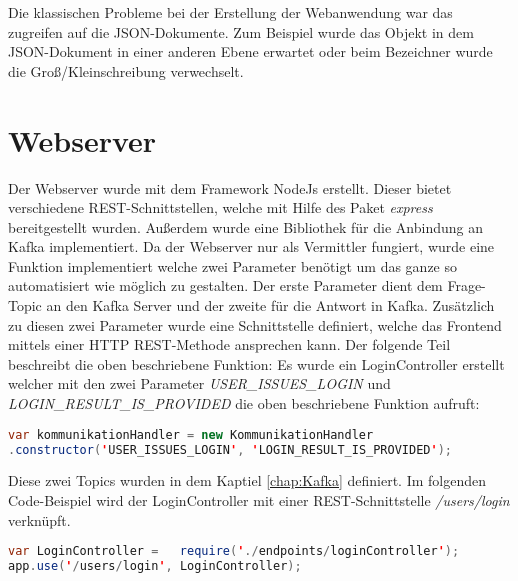 
Die klassischen Probleme bei der Erstellung der Webanwendung war das zugreifen auf die JSON-Dokumente. Zum Beispiel wurde das Objekt in dem JSON-Dokument in einer anderen Ebene erwartet oder beim Bezeichner wurde die Groß/Kleinschreibung verwechselt.


\section{Webserver}
Der Webserver wurde mit dem Framework NodeJs erstellt. Dieser bietet verschiedene REST-Schnittstellen, welche mit Hilfe des Paket \textit{express} bereitgestellt wurden. Außerdem wurde eine Bibliothek für die Anbindung an Kafka implementiert. Da der Webserver nur als Vermittler fungiert, wurde eine Funktion implementiert welche zwei Parameter benötigt um das ganze so automatisiert wie möglich zu gestalten. Der erste Parameter dient dem Frage-Topic an den Kafka Server und der zweite für die Antwort in Kafka. Zusätzlich zu diesen zwei Parameter wurde eine Schnittstelle definiert, welche das Frontend mittels einer  HTTP REST-Methode ansprechen kann. Der folgende Teil beschreibt die oben beschriebene Funktion: 
Es wurde ein LoginController erstellt welcher mit den zwei Parameter \textit{USER\_ISSUES\_LOGIN} und \textit{LOGIN\_RESULT\_IS\_PROVIDED} die oben beschriebene Funktion aufruft: \\
\begin{lstlisting}[language=Java, basicstyle=\small] 
var kommunikationHandler = new KommunikationHandler
.constructor('USER_ISSUES_LOGIN', 'LOGIN_RESULT_IS_PROVIDED');
\end{lstlisting} 
Diese zwei Topics wurden in dem Kaptiel \ref{chap:Kafka} definiert. Im folgenden Code-Beispiel wird der LoginController mit einer REST-Schnittstelle \textit{/users/login} verknüpft. \\
\begin{lstlisting}[language=Java, basicstyle=\small] 
var LoginController = 	require('./endpoints/loginController');
app.use('/users/login', LoginController);
\end{lstlisting}

